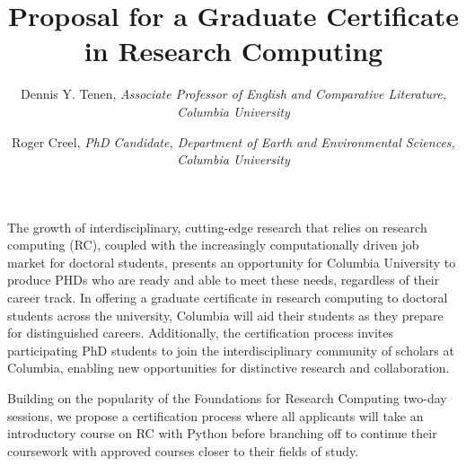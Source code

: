\documentclass[%
  ,
  article,
  ,
  oneside
  ]{memoir}
\date{}
\title{Proposal for a Graduate Certificate in Research Computing}
\author{ Dennis Y. Tenen, \emph{Associate Professor of English and
Comparative Literature, Columbia University}
 \and  Roger Creel, \emph{PhD Candidate, Department of Earth and
Environmental Sciences, Columbia University}
}
\begin{document}
\maketitle



The growth of interdisciplinary, cutting-edge research that relies on
research computing (RC), coupled with the increasingly computationally
driven job market for doctoral students, presents an opportunity for
Columbia University to produce PHDs who are ready and able to meet these
needs, regardless of their career track. In offering a graduate
certificate in research computing to doctoral students across the
university, Columbia will aid their students as they prepare for
distinguished careers. Additionally, the certification process invites
participating PhD students to join the interdisciplinary community of
scholars at Columbia, enabling new opportunities for distinctive
research and collaboration.

Building on the popularity of the Foundations for Research Computing
two-day sessions, we propose a certification process where all
applicants will take an introductory course on RC with Python before
branching off to continue their coursework with approved courses closer
to their fields of study.

\def\textualtrack{

}

\usetikzlibrary {positioning}
\end{document}
